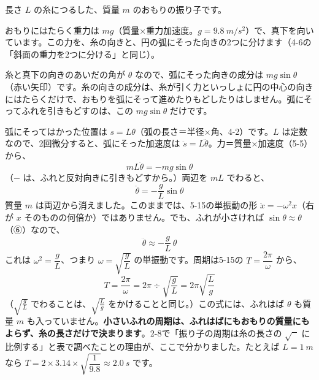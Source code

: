 
\label{bk:5-17:furiko}長さ $L$ の糸につるした、質量 $m$ のおもりの振り子です。

\noindent\begin{minipage}[c]{0.4\linewidth}
\centering
{}
\end{minipage}\hfill
\begin{minipage}[c]{0.56\linewidth}
おもりにはたらく重力は $mg$（質量×重力加速度。$g=\qty{9.8}{m/s^2}$）で、真下を向いています。この力を、糸の向きと、円の弧にそった向きの2つに分けます（4-6の「斜面の重力を2つに分ける」と同じ）。

糸と真下の向きのあいだの角が $\theta$ なので、弧にそった向きの成分は $mg\sin\theta$（赤い矢印）です。糸の向きの成分は、糸が引く力といっしょに円の中心の向きにはたらくだけで、おもりを弧にそって進めたりもどしたりはしません。弧にそってふれを引きもどすのは、この $mg\sin\theta$ だけです。
\end{minipage}\par\vspace{3pt}
弧にそってはかった位置は $s=L\theta$（弧の長さ＝半径×角、4-2）です。$L$ は定数なので、2回微分すると、弧にそった加速度は $\ddot{s}=L\ddot{\theta}$。力＝質量×加速度（5-5）から、
\[ mL\ddot{\theta}=-mg\sin\theta \]
（$-$ は、ふれと反対向きに引きもどすから。）両辺を $mL$ でわると、
\[ \ddot{\theta}=-\frac{g}{L}\sin\theta \]
質量 $m$ は両辺から消えました。このままでは、5-15の単振動の形 $\ddot{x}=-\omega^2x$（右が $x$ そのものの何倍か）ではありません。でも、ふれが小さければ $\sin\theta\approx\theta$（⑥）なので、
\[ \ddot{\theta}\approx-\frac{g}{L}\,\theta \]
これは $\omega^2=\dfrac{g}{L}$、つまり $\omega=\sqrt{\dfrac{g}{L}}$ の単振動です。周期は5-15の $T=\dfrac{2\pi}{\omega}$ から、
\[ T=\frac{2\pi}{\omega}=2\pi\div\sqrt{\frac{g}{L}}=2\pi\sqrt{\frac{L}{g}} \]
（$\sqrt{\frac{g}{L}}$ でわることは、$\sqrt{\frac{L}{g}}$ をかけることと同じ。）この式には、ふれはば $\theta$ も質量 $m$ も入っていません。\textbf{小さいふれの周期は、ふれはばにもおもりの質量にもよらず、糸の長さだけで決まります}。2-8で「振り子の周期は糸の長さの $\sqrt{\phantom{x}}$ に比例する」と表で調べたことの理由が、ここで分かりました。たとえば $L=\qty{1}{m}$ なら $T=2\times3.14\times\sqrt{\dfrac{1}{9.8}}\approx\qty{2.0}{s}$ です。

